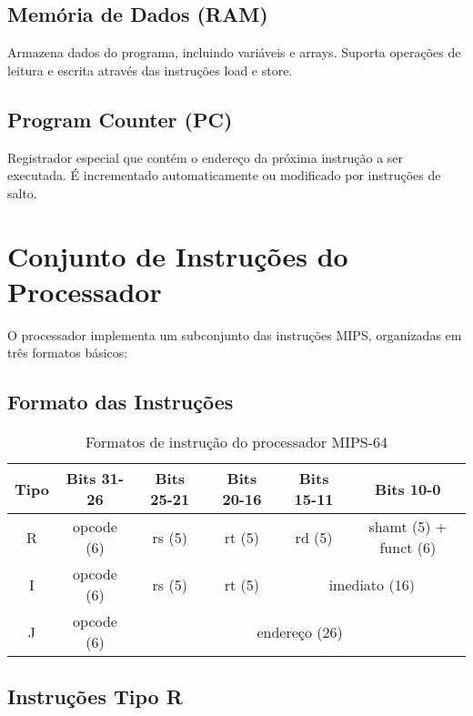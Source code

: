 \documentclass[
	12pt,				%
	oneside,
	a4paper,			%
	english,			%
	french,				%
	spanish,			%
	brazil,				%
	]{abntex2}
\begin{document}
\subsection{Memória de Dados (RAM)}
Armazena dados do programa, incluindo variáveis e arrays. Suporta operações de leitura e escrita através das instruções load e store.

\subsection{Program Counter (PC)}
Registrador especial que contém o endereço da próxima instrução a ser executada. É incrementado automaticamente ou modificado por instruções de salto.

\section{Conjunto de Instruções do Processador}

O processador implementa um subconjunto das instruções MIPS, organizadas em três formatos básicos:

\subsection{Formato das Instruções}

\begin{table}[H]
\centering
\caption{Formatos de instrução do processador MIPS-64}
\begin{tabular}{|c|c|c|c|c|c|}
\hline
\textbf{Tipo} & \textbf{Bits 31-26} & \textbf{Bits 25-21} & \textbf{Bits 20-16} & \textbf{Bits 15-11} & \textbf{Bits 10-0} \\
\hline
R & opcode (6) & rs (5) & rt (5) & rd (5) & shamt (5) + funct (6) \\
\hline
I & opcode (6) & rs (5) & rt (5) & \multicolumn{2}{c|}{imediato (16)} \\
\hline
J & opcode (6) & \multicolumn{4}{c|}{endereço (26)} \\
\hline
\end{tabular}
\end{table}

\subsection{Instruções Tipo R}
\end{document}
